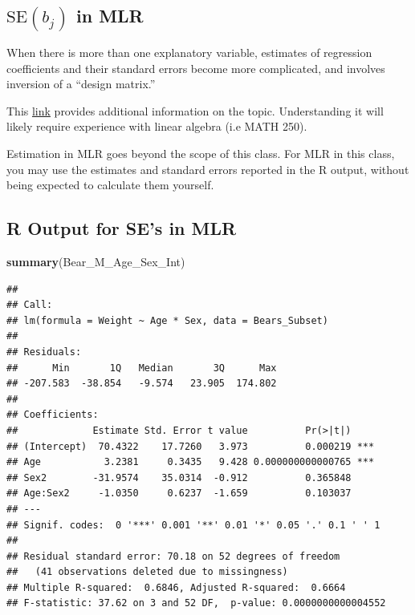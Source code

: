 \documentclass[]{book}
\newenvironment{Shaded}{\begin{snugshade}}{\end{snugshade}}
\newcommand{\KeywordTok}[1]{\textcolor[rgb]{0.13,0.29,0.53}{\textbf{#1}}}
\newcommand{\NormalTok}[1]{#1}
\begin{document}
\subsection{\texorpdfstring{\(\text{SE}(b_j)\) in
MLR}{\textbackslash{}text\{SE\}(b\_j) in MLR}}\label{textseb_j-in-mlr}

When there is more than one explanatory variable, estimates of
regression coefficients and their standard errors become more
complicated, and involves inversion of a ``design matrix.''

This \href{http://users.stat.umn.edu/~helwig/notes/mlr-Notes.pdf}{link}
provides additional information on the topic. Understanding it will
likely require experience with linear algebra (i.e MATH 250).

Estimation in MLR goes beyond the scope of this class. For MLR in this
class, you may use the estimates and standard errors reported in the R
output, without being expected to calculate them yourself.

\subsection{R Output for SE's in MLR}\label{r-output-for-ses-in-mlr}

\begin{Shaded}
\begin{Highlighting}[]
\KeywordTok{summary}\NormalTok{(Bear_M_Age_Sex_Int)}
\end{Highlighting}
\end{Shaded}

\begin{verbatim}
## 
## Call:
## lm(formula = Weight ~ Age * Sex, data = Bears_Subset)
## 
## Residuals:
##      Min       1Q   Median       3Q      Max 
## -207.583  -38.854   -9.574   23.905  174.802 
## 
## Coefficients:
##             Estimate Std. Error t value          Pr(>|t|)    
## (Intercept)  70.4322    17.7260   3.973          0.000219 ***
## Age           3.2381     0.3435   9.428 0.000000000000765 ***
## Sex2        -31.9574    35.0314  -0.912          0.365848    
## Age:Sex2     -1.0350     0.6237  -1.659          0.103037    
## ---
## Signif. codes:  0 '***' 0.001 '**' 0.01 '*' 0.05 '.' 0.1 ' ' 1
## 
## Residual standard error: 70.18 on 52 degrees of freedom
##   (41 observations deleted due to missingness)
## Multiple R-squared:  0.6846, Adjusted R-squared:  0.6664 
## F-statistic: 37.62 on 3 and 52 DF,  p-value: 0.0000000000004552
\end{verbatim}
\end{document}
